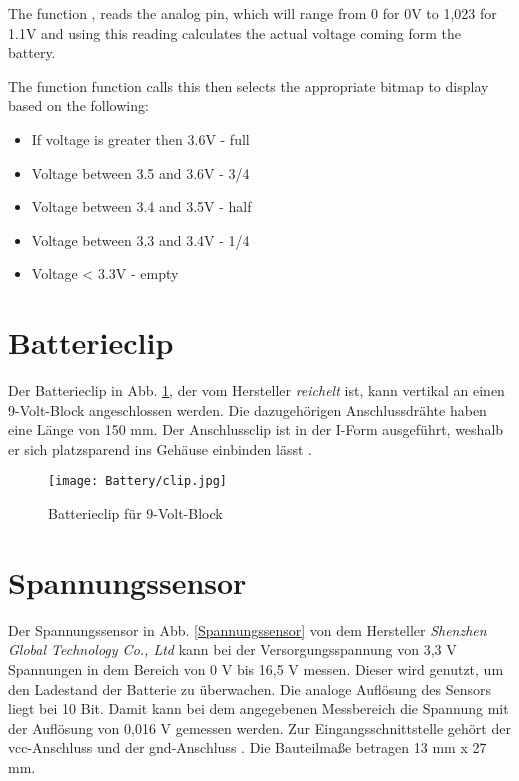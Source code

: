 The function , reads the analog pin, which will range from 0 for 0V to 1,023 for 1.1V and using this reading calculates the actual voltage coming form the battery. 

The function  function calls this then selects the appropriate bitmap to display based on the following: 

\begin{itemize}
    \item If voltage is greater then 3.6V - full 
    \item Voltage between 3.5 and 3.6V - 3/4 
    \item Voltage between 3.4 and 3.5V - half 
    \item Voltage between 3.3 and 3.4V - 1/4 
    \item Voltage < 3.3V - empty 
\end{itemize}



\section{Batterieclip}

Der Batterieclip in Abb. \ref{Batterieclip für 9-Volt-Block}, der vom Hersteller \textit{reichelt} ist, kann vertikal an einen 9-Volt-Block angeschlossen werden. Die dazugehörigen Anschlussdrähte haben eine Länge von 150 mm. Der Anschlussclip ist in der I-Form ausgeführt, weshalb er sich platzsparend ins Gehäuse einbinden lässt \cite{Reichelt:2011}.

\begin{figure}[h]
    \begin{center}
        \texttt{[image: Battery/clip.jpg]}
        \caption{Batterieclip für 9-Volt-Block\cite{Reichelt:2024a}}
        \label{Batterieclip für 9-Volt-Block}
    \end{center}
\end{figure} 



\section{Spannungssensor}

Der Spannungssensor in Abb. \ref{Spannungssensor} von dem Hersteller \textit{Shenzhen Global Technology Co., Ltd} kann bei der Versorgungsspannung von 3,3 V Spannungen in dem Bereich von 0 V bis 16,5 V messen. Dieser wird genutzt, um den Ladestand der Batterie zu überwachen. Die analoge Auflösung des Sensors liegt bei 10 Bit. Damit kann bei dem angegebenen Messbereich die Spannung mit der Auflösung von 0,016 V gemessen werden. Zur Eingangsschnittstelle gehört der \ac{vcc}-Anschluss und der \ac{gnd}-Anschluss \cite{Shenzhen:2015}. Die Bauteilmaße betragen 13 mm x 27 mm.



